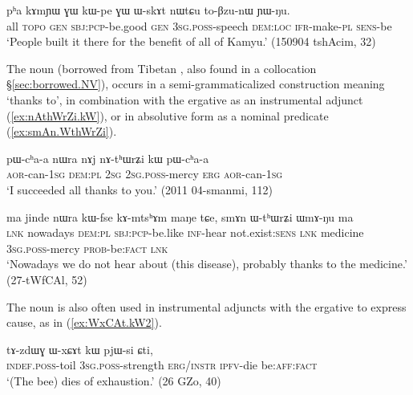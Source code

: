 \begin{exe}
\ex \label{ex:kWpe.GW.WskAt}
\gll pʰa kɤmɲɯ ɣɯ kɯ-pe ɣɯ ɯ-skɤt nɯtɕu to-βzu-nɯ ɲɯ-ŋu. \\
all  \textsc{topo} \textsc{gen} \textsc{sbj}:\textsc{pcp}-be.good \textsc{gen} \textsc{3sg}.\textsc{poss}-speech \textsc{dem}:\textsc{loc} \textsc{ifr}-make-\textsc{pl} \textsc{sens}-be \\
\glt `People built it there for the benefit of all of Kamyu.' (150904 tshAcim, 32)
\end{exe}

The noun  (borrowed from Tibetan , also found in a collocation §\ref{sec:borrowed.NV}), occurs in a semi-grammaticalized construction meaning `thanks to', in combination with the ergative  as an instrumental adjunct (\ref{ex:nAthWrZi.kW}), or in absolutive form as a nominal predicate (\ref{ex:smAn.WthWrZi}).

  \begin{exe}
\ex \label{ex:nAthWrZi.kW}
\gll pɯ-cʰa-a nɯra nɤj nɤ-tʰɯrʑi kɯ pɯ-cʰa-a \\
\textsc{aor}-can-\textsc{1sg} \textsc{dem}:\textsc{pl} \textsc{2sg} \textsc{2sg}.\textsc{poss}-mercy \textsc{erg} \textsc{aor}-can-\textsc{1sg} \\
\glt `I succeeded all thanks to you.' (2011 04-smanmi, 112)
  \end{exe}

  \begin{exe}
\ex \label{ex:smAn.WthWrZi}
\gll   ma jinde nɯra kɯ-fse kɤ-mtsʰɤm maŋe tɕe, smɤn ɯ-tʰɯrʑi ɯmɤ-ŋu ma \\
\textsc{lnk} nowadays \textsc{dem}:\textsc{pl} \textsc{sbj}:\textsc{pcp}-be.like \textsc{inf}-hear not.exist:\textsc{sens} \textsc{lnk} medicine   \textsc{3sg}.\textsc{poss}-mercy \textsc{prob}-be:\textsc{fact} \textsc{lnk} \\
\glt `Nowadays we do not hear about (this disease), probably thanks to the medicine.' (27-tWfCAl, 52)
  \end{exe}  

The noun  is also often used in instrumental adjuncts with the ergative to express cause, as in (\ref{ex:WxCAt.kW2}).

  \begin{exe}
\ex \label{ex:WxCAt.kW2}
\gll   tɤ-zdɯɣ ɯ-xɕɤt kɯ pjɯ-si ɕti, \\
  \textsc{indef}.\textsc{poss}-toil  \textsc{3sg}.\textsc{poss}-strength \textsc{erg/instr} \textsc{ipfv}-die be:\textsc{aff}:\textsc{fact} \\
 \glt `(The bee) dies of exhaustion.' (26 GZo, 40)
  \end{exe}
